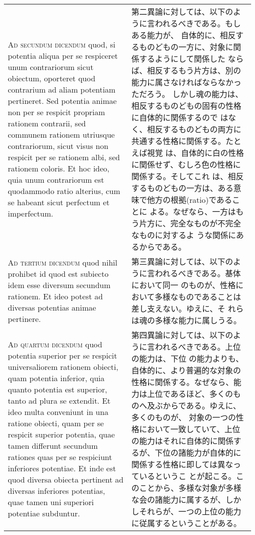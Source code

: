 \documentclass[paper=a4paper,fontsize=10pt,jafontsize=9pt,titlepage]{jlreq}
\begin{document}
\begin{longtable}{p{21em}p{21em}}
\\


{\scshape Ad secundum dicendum} quod, si potentia aliqua per se
respiceret unum contrariorum sicut obiectum, oporteret quod contrarium
ad aliam potentiam pertineret. Sed potentia animae non per se respicit
propriam rationem contrarii, sed communem rationem utriusque
contrariorum, sicut visus non respicit per se rationem albi, sed
rationem coloris. Et hoc ideo, quia unum contrariorum est quodammodo
ratio alterius, cum se habeant sicut perfectum et imperfectum.
 
 
&

 第二異論に対しては、以下のように言われるべきである。もしある能力が、
 自体的に、相反するものどもの一方に、対象に関係するようにして関係した
 ならば、相反するもう片方は、別の能力に属さなければならなかっただろう。
 しかし魂の能力は、相反するものどもの固有の性格に自体的に関係するので
 はなく、相反するものどもの両方に共通する性格に関係する。たとえば視覚
 は、自体的に白の性格に関係せず、むしろ色の性格に関係する。そしてこれ
 は、相反するものどもの一方は、ある意味で他方の根拠(ratio)であることに
 よる。なぜなら、一方はもう片方に、完全なものが不完全なものに対するよ
 うな関係にあるからである。

\\


 {\scshape Ad tertium dicendum} quod nihil prohibet id quod est
 subiecto idem esse diversum secundum rationem. Et ideo potest ad
 diversas potentias animae pertinere.

 
&

 第三異論に対しては、以下のように言われるべきである。基体において同一
 のものが、性格において多様なものであることは差し支えない。ゆえに、そ
 れらは魂の多様な能力に属しうる。


\\

 {\scshape Ad quartum dicendum} quod potentia superior per se respicit
 universaliorem rationem obiecti, quam potentia inferior, quia quanto
 potentia est superior, tanto ad plura se extendit. Et ideo multa
 conveniunt in una ratione obiecti, quam per se respicit superior
 potentia, quae tamen differunt secundum rationes quas per se
 respiciunt inferiores potentiae. Et inde est quod diversa obiecta
 pertinent ad diversas inferiores potentias, quae tamen uni superiori
 potentiae subduntur.

  
&

第四異論に対しては、以下のように言われるべきである。上位の能力は、下位
の能力よりも、自体的に、より普遍的な対象の性格に関係する。なぜなら、能
力は上位であるほど、多くのものへ及ぶからである。ゆえに、多くのものが、
対象の一つの性格において一致していて、上位の能力はそれに自体的に関係す
るが、下位の諸能力が自体的に関係する性格に即しては異なっているというこ
とが起こる。このことから、多様な対象が多様な会の諸能力に属するが、しか
しそれらが、一つの上位の能力に従属するということがある。


\end{longtable}
\newpage
\end{document}
